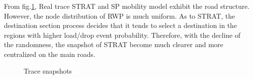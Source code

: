 From fig.\ref{figure_trace_snapshots}, Real trace STRAT and SP mobility model exhibit the road structure. However, the node distribution of RWP is much uniform.
As to STRAT, the destination section process decides that it tends to select a destination in the regions with higher load/drop event probability.
Therefore, with the decline of the randomness, the snapshot of STRAT become much clearer and more centralized on the main roads.
\begin{figure}[H]
\centering
{}
\vspace{0.in}
\hspace{0.0in}
\vspace{0.in}
\hspace{0.0in}
\vspace{0.in}
\hspace{0.0in}
\caption{Trace snapshots}\label{figure_trace_snapshots}
\end{figure}



